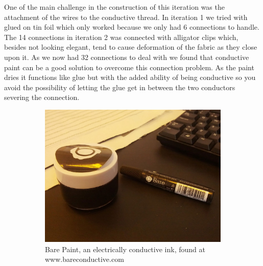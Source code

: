One of the main challenge in the construction of this iteration was the attachment of the wires to the conductive thread.
In iteration 1 we tried with glued on tin foil which only worked because we only had 6 connections to handle.
The 14 connections in iteration 2 was connected with alligator clips which, besides not looking elegant, tend to cause deformation of the fabric as they close upon it.
As we now had 32 connections to deal with we found that conductive paint can be a good solution to overcome this connection problem.
As the paint dries it functions like glue but with the added ability of being conductive so you avoid the possibility of letting the glue get in between the two conductors severing the connection.  

\begin{figure}[h]
\centering
\begin{subfigure}[t]{.45\textwidth}
  \centering
  \includegraphics[width=.9\linewidth]{figures/touch/barepaint}
  \caption{Bare Paint, an electrically conductive ink, found at www.bareconductive.com}
\end{subfigure}%
\hspace{0.5cm}
\begin{subfigure}[t]{.45\textwidth}
  \centering

\end{subfigure}
\end{figure}

